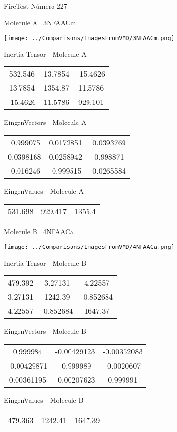 \vtab[-3cm]
\begin{center}
{\large FireTest \tab Número 227}
\end{center}
\begin{multicols}{2}
\begin{center}

Molecule A \
3NFAACm

\texttt{[image: ../Comparisons/ImagesFromVMD/3NFAACm.png]}

Inertia Tensor - Molecule A \\
\begin{tabular}{|c c c|}
532.546	 & 	13.7854	 & 	-15.4626	 \\
13.7854	 & 	1354.87	 & 	11.5786	 \\
-15.4626	 & 	11.5786	 & 	929.101
\end{tabular}

\vtab
 EingenVectors - Molecule A     \\
\begin{tabular}{|c c c|}
-0.999075	 & 	0.0172851	 & 	-0.0393769	 \\
0.0398168	 & 	0.0258942	 & 	-0.998871	 \\
-0.016246	 & 	-0.999515	 & 	-0.0265584
\end{tabular}

\vtab
 EingenValues - Molecule A     \\
\begin{tabular}{|c c c|}
531.698	 & 	929.417	 & 	1355.4	 \\
\end{tabular}
\columnbreak

Molecule B \
4NFAACa

\texttt{[image: ../Comparisons/ImagesFromVMD/4NFAACa.png]}

Inertia Tensor - Molecule B \\
\begin{tabular}{|c c c|}
479.392	 & 	3.27131	 & 	4.22557	 \\
3.27131	 & 	1242.39	 & 	-0.852684	 \\
4.22557	 & 	-0.852684	 & 	1647.37
\end{tabular}

\vtab
 EingenVectors - Molecule B     \\
\begin{tabular}{|c c c|}
0.999984	 & 	-0.00429123	 & 	-0.00362083	 \\
-0.00429871	 & 	-0.999989	 & 	-0.0020607	 \\
0.00361195	 & 	-0.00207623	 & 	0.999991
\end{tabular}

\vtab
 EingenValues - Molecule B     \\
\begin{tabular}{|c c c|}
479.363	 & 	1242.41	 & 	1647.39	 \\
\end{tabular}

\end{center}
\end{multicols}

